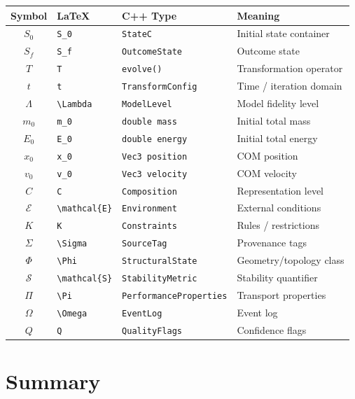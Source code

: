 \documentclass[11pt]{article}
\begin{document}
\begin{center}
\begin{tabular}{cllp{6cm}}
\toprule
\textbf{Symbol} & \textbf{LaTeX} & \textbf{C++ Type} & \textbf{Meaning} \\
\midrule
$S_0$ & \verb|S_0| & \texttt{StateC} & Initial state container \\
$S_f$ & \verb|S_f| & \texttt{OutcomeState} & Outcome state \\
$T$ & \verb|T| & \texttt{evolve()} & Transformation operator \\
$t$ & \verb|t| & \texttt{TransformConfig} & Time / iteration domain \\
$\Lambda$ & \verb|\Lambda| & \texttt{ModelLevel} & Model fidelity level \\
\midrule
$m_0$ & \verb|m_0| & \texttt{double mass} & Initial total mass \\
$E_0$ & \verb|E_0| & \texttt{double energy} & Initial total energy \\
$x_0$ & \verb|x_0| & \texttt{Vec3 position} & COM position \\
$v_0$ & \verb|v_0| & \texttt{Vec3 velocity} & COM velocity \\
$C$ & \verb|C| & \texttt{Composition} & Representation level \\
$\mathcal{E}$ & \verb|\mathcal{E}| & \texttt{Environment} & External conditions \\
$K$ & \verb|K| & \texttt{Constraints} & Rules / restrictions \\
$\Sigma$ & \verb|\Sigma| & \texttt{SourceTag} & Provenance tags \\
\midrule
$\Phi$ & \verb|\Phi| & \texttt{StructuralState} & Geometry/topology class \\
$\mathcal{S}$ & \verb|\mathcal{S}| & \texttt{StabilityMetric} & Stability quantifier \\
$\Pi$ & \verb|\Pi| & \texttt{PerformanceProperties} & Transport properties \\
$\Omega$ & \verb|\Omega| & \texttt{EventLog} & Event log \\
$Q$ & \verb|Q| & \texttt{QualityFlags} & Confidence flags \\
\bottomrule
\end{tabular}
\end{center}

\section{Summary}
\end{document}
